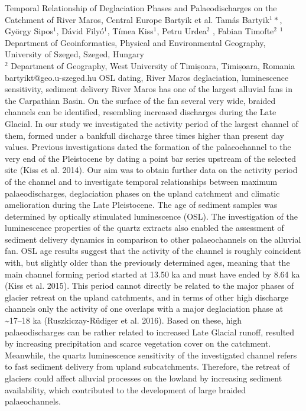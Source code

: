 \abstract
{Temporal Relationship of Deglaciation Phases and Palaeodischarges on the Catchment of River Maros, Central Europe} %
{Bartyik et al.} %
{Tamás Bartyik$^1*$, György Sipos$^1$, Dávid Filyó$^1$, Tímea Kiss$^1$, Petru Urdea$^2$ , Fabian Timofte$^2$} %
{\KLtag} %
{$^1$Department of Geoinformatics, Physical and Environmental Geography, University of Szeged, Szeged, Hungary\\
	$^2$ Department of Geography, West University of Timișoara, Timișoara, Romania
} %
{bartyikt@geo.u-szeged.hu}  %
{OSL dating, River Maros deglaciation, luminescence sensitivity, sediment delivery}%
{River Maros has one of the largest alluvial fans in the Carpathian Basin. On the surface of the fan several very wide, braided channels can be identified, resembling increased discharges during the Late Glacial. In our study we investigated the activity period of the largest channel of them, formed under a bankfull discharge three times higher than present day values. Previous investigations dated the formation of the palaeochannel to the very end of the Pleistocene by dating a point bar series upstream of the selected site (Kiss et al. 2014). Our aim was to obtain further data on the activity period of the channel and to investigate temporal relationships between maximum palaeodischarges, deglaciation phases on the upland catchment and climatic amelioration during the Late Pleistocene. The age of sediment samples was determined by optically stimulated luminescence (OSL). The investigation of the luminescence properties of the quartz extracts also enabled the assessment of sediment delivery dynamics in comparison to other palaeochannels on the alluvial fan. 
OSL age results suggest that the activity of the channel is roughly coincident with, but slightly older than the previously determined ages, meaning that the main channel forming period started at 13.50 ka and must have ended by 8.64 ka (Kiss et al. 2015). This period cannot directly be related to the major phases of glacier retreat on the upland catchments, and in terms of other high discharge channels only the activity of one overlaps with a major deglaciation phase at \textasciitilde17--18 ka (Ruszkiczay-Rüdiger et al. 2016). Based on these, high palaeodischarges can be rather related to increased Late Glacial runoff, resulted by increasing precipitation and scarce vegetation cover on the catchment. Meanwhile, the quartz luminescence sensitivity of the investigated channel refers to fast sediment delivery from upland subcatchments. Therefore, the retreat of glaciers could affect alluvial processes on the lowland by increasing sediment availability, which contributed to the development of large braided palaeochannels.
}%
